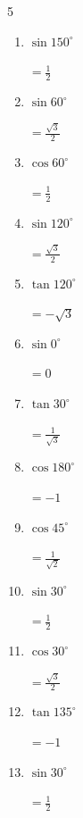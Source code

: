 \begin{multicols}{5}
\begin{enumerate}
        $\displaystyle =-\frac{1}{\sqrt{2}}$

  \item $\displaystyle \sin{150^\circ}$

        $\displaystyle =\frac{1}{2}$

  \item $\displaystyle \sin{60^\circ}$

        $\displaystyle =\frac{\sqrt{3}}{2}$

  \item $\displaystyle \cos{60^\circ}$

        $\displaystyle =\frac{1}{2}$

  \item $\displaystyle \sin{120^\circ}$

        $\displaystyle =\frac{\sqrt{3}}{2}$

  \item $\displaystyle \tan{120^\circ}$

        $\displaystyle =-\sqrt{3}$

  \item $\displaystyle \sin{0^\circ}$

        $\displaystyle =0$

  \item $\displaystyle \tan{30^\circ}$

        $\displaystyle =\frac{1}{\sqrt{3}}$

  \item $\displaystyle \cos{180^\circ}$

        $\displaystyle =-1$

  \item $\displaystyle \cos{45^\circ}$

        $\displaystyle =\frac{1}{\sqrt{2}}$

  \item $\displaystyle \sin{30^\circ}$

        $\displaystyle =\frac{1}{2}$

  \item $\displaystyle \cos{30^\circ}$

        $\displaystyle =\frac{\sqrt{3}}{2}$

  \item $\displaystyle \tan{135^\circ}$

        $\displaystyle =-1$

  \item $\displaystyle \sin{30^\circ}$

        $\displaystyle =\frac{1}{2}$


\end{enumerate}
\end{multicols}
